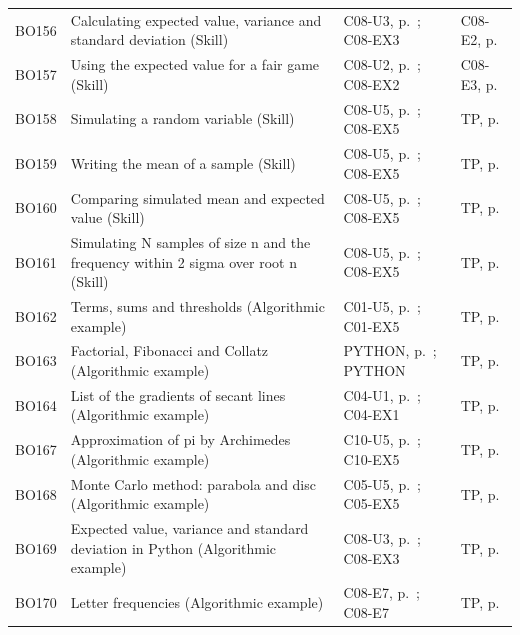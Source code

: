 \begin{longtable}{p{.1\linewidth}p{.43\linewidth}p{.19\linewidth}p{.16\linewidth}}
BO156 & Calculating expected value, variance and standard deviation (Skill) & C08-U3, p.\,\pageref{C08-U3} ; C08-EX3 & C08-E2, p.\,\pageref{C08-E2} \\
BO157 & Using the expected value for a fair game (Skill) & C08-U2, p.\,\pageref{C08-U2} ; C08-EX2 & C08-E3, p.\,\pageref{C08-E3} \\
BO158 & Simulating a random variable (Skill) & C08-U5, p.\,\pageref{C08-U5} ; C08-EX5 & TP, p.\,\pageref{TP} \\
BO159 & Writing the mean of a sample (Skill) & C08-U5, p.\,\pageref{C08-U5} ; C08-EX5 & TP, p.\,\pageref{TP} \\
BO160 & Comparing simulated mean and expected value (Skill) & C08-U5, p.\,\pageref{C08-U5} ; C08-EX5 & TP, p.\,\pageref{TP} \\
BO161 & Simulating N samples of size n and the frequency within 2 sigma over root n (Skill) & C08-U5, p.\,\pageref{C08-U5} ; C08-EX5 & TP, p.\,\pageref{TP} \\
BO162 & Terms, sums and thresholds (Algorithmic example) & C01-U5, p.\,\pageref{C01-U5} ; C01-EX5 & TP, p.\,\pageref{TP} \\
BO163 & Factorial, Fibonacci and Collatz (Algorithmic example) & PYTHON, p.\,\pageref{PYTHON} ; PYTHON & TP, p.\,\pageref{TP} \\
BO164 & List of the gradients of secant lines (Algorithmic example) & C04-U1, p.\,\pageref{C04-U1} ; C04-EX1 & TP, p.\,\pageref{TP} \\
BO167 & Approximation of pi by Archimedes (Algorithmic example) & C10-U5, p.\,\pageref{C10-U5} ; C10-EX5 & TP, p.\,\pageref{TP} \\
BO168 & Monte Carlo method: parabola and disc (Algorithmic example) & C05-U5, p.\,\pageref{C05-U5} ; C05-EX5 & TP, p.\,\pageref{TP} \\
BO169 & Expected value, variance and standard deviation in Python (Algorithmic example) & C08-U3, p.\,\pageref{C08-U3} ; C08-EX3 & TP, p.\,\pageref{TP} \\
BO170 & Letter frequencies (Algorithmic example) & C08-E7, p.\,\pageref{C08-E7} ; C08-E7 & TP, p.\,\pageref{TP} \\
\bottomrule\end{longtable}\normalsize